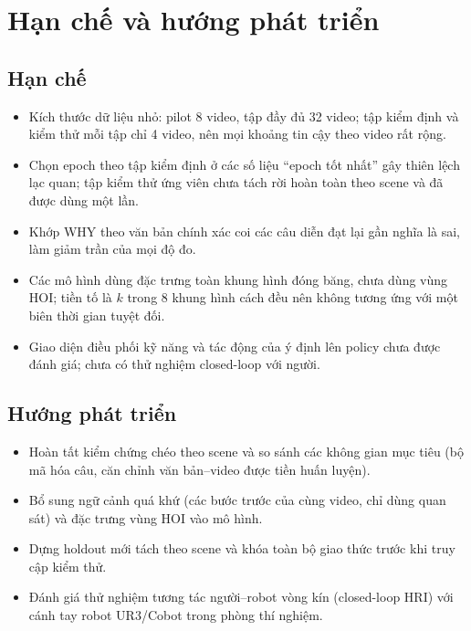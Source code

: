 \documentclass[12pt,a4paper]{report}
\begin{document}
\section{Hạn chế và hướng phát triển}

\subsection{Hạn chế}
\begin{itemize}
    \item Kích thước dữ liệu nhỏ: pilot 8 video, tập đầy đủ 32 video; tập kiểm định và kiểm thử mỗi tập chỉ 4 video, nên mọi khoảng tin cậy theo video rất rộng.
    \item Chọn epoch theo tập kiểm định ở các số liệu ``epoch tốt nhất'' gây thiên lệch lạc quan; tập kiểm thử ứng viên chưa tách rời hoàn toàn theo scene và đã được dùng một lần.
    \item Khớp WHY theo văn bản chính xác coi các câu diễn đạt lại gần nghĩa là sai, làm giảm trần của mọi độ đo.
    \item Các mô hình dùng đặc trưng toàn khung hình đóng băng, chưa dùng vùng HOI; tiền tố là $k$ trong 8 khung hình cách đều nên không tương ứng với một biên thời gian tuyệt đối.
    \item Giao diện điều phối kỹ năng và tác động của ý định lên policy chưa được đánh giá; chưa có thử nghiệm closed-loop với người.
\end{itemize}

\subsection{Hướng phát triển}
\begin{itemize}
    \item Hoàn tất kiểm chứng chéo theo scene và so sánh các không gian mục tiêu (bộ mã hóa câu, căn chỉnh văn bản--video được tiền huấn luyện).
    \item Bổ sung ngữ cảnh quá khứ (các bước trước của cùng video, chỉ dùng quan sát) và đặc trưng vùng HOI vào mô hình.
    \item Dựng holdout mới tách theo scene và khóa toàn bộ giao thức trước khi truy cập kiểm thử.
    \item Đánh giá thử nghiệm tương tác người--robot vòng kín (closed-loop HRI) với cánh tay robot UR3/Cobot trong phòng thí nghiệm.
\end{itemize}
\end{document}
